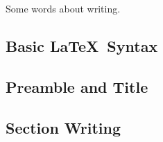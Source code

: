 Some words about writing.
\subsection{Basic \LaTeX\ Syntax}
\subsection{Preamble and Title}
\subsection{Section Writing}